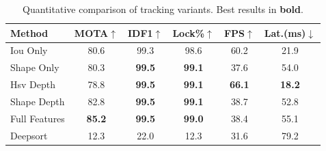 \begin{table}[t]
\centering
\caption{Quantitative comparison of tracking variants. Best results in \textbf{bold}.}
\label{tab:results}
\setlength{\tabcolsep}{4pt}
\begin{tabular}{lccccc}
\toprule
Method & MOTA$\uparrow$ & IDF1$\uparrow$ & Lock\%$\uparrow$ & FPS$\uparrow$ & Lat.(ms)$\downarrow$ \\
\midrule
Iou Only & 80.6 & 99.3 & 98.6 & 60.2 & 21.9 \\
Shape Only & 80.3 & \textbf{99.5} & \textbf{99.1} & 37.6 & 54.0 \\
Hsv Depth & 78.8 & \textbf{99.5} & \textbf{99.1} & \textbf{66.1} & \textbf{18.2} \\
Shape Depth & 82.8 & \textbf{99.5} & \textbf{99.1} & 38.7 & 52.8 \\
Full Features & \textbf{85.2} & \textbf{99.5} & \textbf{99.0} & 38.4 & 55.1 \\
Deepsort & 12.3 & 22.0 & 12.3 & 31.6 & 79.2 \\
\bottomrule
\end{tabular}
\end{table}
